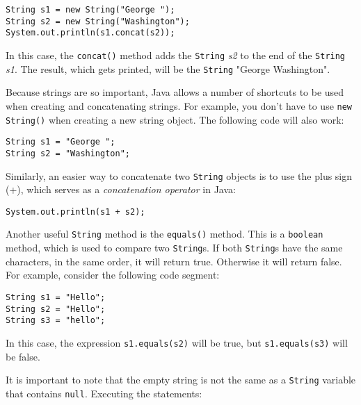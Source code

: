 \begin{jjjlisting}
\begin{lstlisting}
String s1 = new String("George ");
String s2 = new String("Washington");
System.out.println(s1.concat(s2));
\end{lstlisting}
\end{jjjlisting}

\noindent In this case, the {\tt concat()} method adds 
the {\tt String} {\it s2} to the end of the {\tt String} {\it s1}. The
result, which gets printed, will be the {\tt String} "George
Washington".

Because strings are so important, Java allows a number of
shortcuts to be used when creating and concatenating strings.
For example, you don't have to use {\tt new String()} when
creating a new string object. The following code will also work:

\begin{jjjlisting}
\begin{lstlisting}
String s1 = "George ";
String s2 = "Washington";
\end{lstlisting}
\end{jjjlisting}

\noindent Similarly, an easier way to concatenate two {\tt String}
objects is to use the plus sign (+), which serves as a {\em concatenation
operator} in Java:

\begin{jjjlisting}
\begin{lstlisting}
System.out.println(s1 + s2);
\end{lstlisting}
\end{jjjlisting}

Another useful {\tt String} method is the {\tt equals()}
method. This is a {\tt boolean} method, which is used to compare two
{\tt String}s. If both {\tt String}s have the same characters, in the
same order, it will return true. Otherwise it will return false. For
example, consider the following code segment:

\begin{jjjlisting}
\begin{lstlisting}
String s1 = "Hello";
String s2 = "Hello";
String s3 = "hello";
\end{lstlisting}
\end{jjjlisting}

\noindent In this case, the expression {\tt s1.equals(s2)} will be
true, but {\tt s1.equals(s3)} will be false. 

It is important to note that the empty string is not the same as a
{\tt String} variable that contains {\tt null}. 
Executing the statements:

